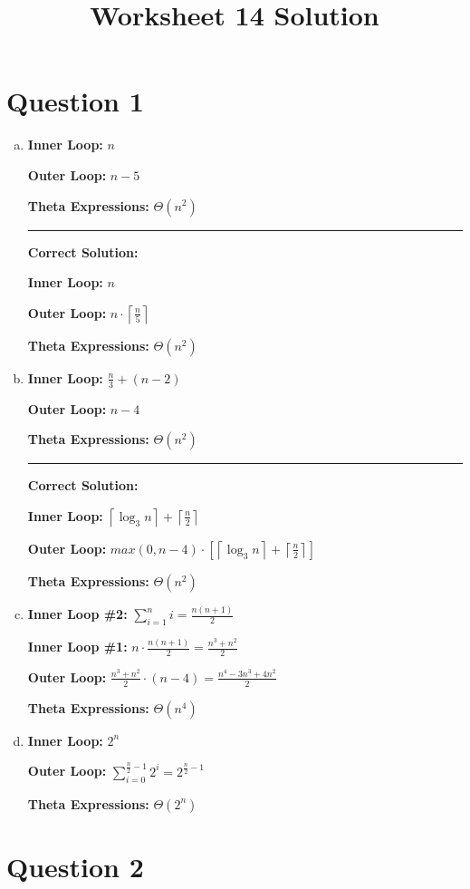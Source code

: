 \documentclass[12pt]{article}
\begin{document}
\title{Worksheet 14 Solution}
\maketitle

\section*{Question 1}
\begin{enumerate}[a.]
    \item

    \textbf{Inner Loop:} $n$

    \textbf{Outer Loop:} $n - 5$

    \textbf{Theta Expressions:} $\Theta (n^2)$

    \noindent\rule{\textwidth}{1pt}

    \textbf{Correct Solution:}

    \bigskip

    \textbf{Inner Loop:} $n$

    \textbf{Outer Loop:} $n \cdot \left\lceil \displaystyle\frac{n}{5} \right\rceil$

    \textbf{Theta Expressions:} $\Theta (n^2)$

    \item

    \textbf{Inner Loop:} $\displaystyle \frac{n}{3} + (n - 2)$

    \textbf{Outer Loop:} $n - 4$

    \textbf{Theta Expressions:} $\Theta (n^2)$

    \noindent\rule{\textwidth}{1pt}

    \textbf{Correct Solution:}

    \bigskip

    \textbf{Inner Loop:} $\left\lceil \log_3 n \right\rceil + \left\lceil \displaystyle\frac{n}{2} \right\rceil$

    \textbf{Outer Loop:} $max(0, n-4) \cdot \left[ \left\lceil \log_3 n \right\rceil + \left\lceil \displaystyle\frac{n}{2} \right\rceil \right]$

    \textbf{Theta Expressions:} $\Theta (n^2)$

    \item

    \textbf{Inner Loop \#2:} $\sum\limits_{i=1}^n i = \displaystyle\frac{n(n+1)}{2}$

    \textbf{Inner Loop \#1:} $n \cdot \displaystyle\frac{n(n+1)}{2} = \displaystyle\frac{n^3 + n^2}{2}$

    \textbf{Outer Loop:} $\displaystyle\frac{n^3 + n^2}{2} \cdot (n - 4) = \displaystyle\frac{n^4 - 3n^3 + 4n^2}{2}$

    \textbf{Theta Expressions:} $\Theta (n^4)$

    \item

    \textbf{Inner Loop:} $2^n$

    \textbf{Outer Loop:} $\displaystyle\sum\limits_{i=0}^{\frac{n}{2} - 1} 2^i = 2^{\frac{n}{2} - 1}$

    \textbf{Theta Expressions:} $\Theta (2^n)$


\end{enumerate}

\section*{Question 2}
\end{document}
